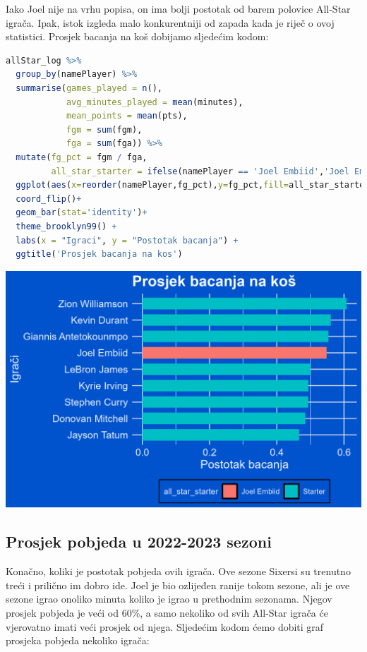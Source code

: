 \documentclass[letterpaper,11pt,leqno]{article}
\begin{document}
Iako Joel nije na vrhu popisa, on ima bolji postotak od barem polovice All-Star igrača. Ipak, istok izgleda malo konkurentniji od zapada kada je riječ o ovoj statistici. Prosjek bacanja na koš dobijamo sljedećim kodom:

\begin{lstlisting}[language=R]
allStar_log %>% 
  group_by(namePlayer) %>% 
  summarise(games_played = n(),
            avg_minutes_played = mean(minutes),
            mean_points = mean(pts),
            fgm = sum(fgm),
            fga = sum(fga)) %>% 
  mutate(fg_pct = fgm / fga,
         all_star_starter = ifelse(namePlayer == 'Joel Embiid','Joel Embiid' , 'Starter')) %>% 
  ggplot(aes(x=reorder(namePlayer,fg_pct),y=fg_pct,fill=all_star_starter)) + 
  coord_flip()+
  geom_bar(stat='identity')+  
  theme_brooklyn99() + 
  labs(x = "Igraci", y = "Postotak bacanja") + 
  ggtitle('Prosjek bacanja na kos')
\end{lstlisting}

\begin{center}
    \includegraphics[scale=1]{ProsjekBacanja.png}
\end{center}

\subsection{Prosjek pobjeda u 2022-2023 sezoni} 

Konačno, koliki je postotak pobjeda ovih igrača. Ove sezone Sixersi su trenutno treći i prilično im dobro ide. Joel je bio ozlijeđen ranije tokom sezone, ali je ove sezone igrao onoliko minuta koliko je igrao u prethodnim sezonama. Njegov prosjek pobjeda je veći od 60\%, a samo nekoliko od svih All-Star igrača će vjerovatno imati veći prosjek od njega. Sljedećim kodom ćemo dobiti graf prosjeka pobjeda nekoliko igrača:
\end{document}
